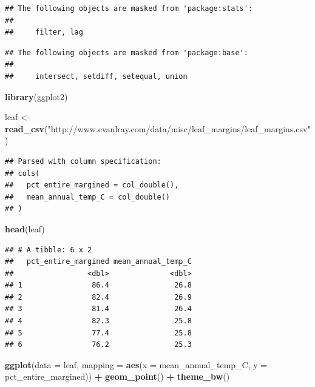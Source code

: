 \documentclass[]{article}
\newenvironment{Shaded}{\begin{snugshade}}{\end{snugshade}}
\newcommand{\KeywordTok}[1]{\textcolor[rgb]{0.13,0.29,0.53}{\textbf{#1}}}
\newcommand{\DataTypeTok}[1]{\textcolor[rgb]{0.13,0.29,0.53}{#1}}
\newcommand{\StringTok}[1]{\textcolor[rgb]{0.31,0.60,0.02}{#1}}
\newcommand{\OperatorTok}[1]{\textcolor[rgb]{0.81,0.36,0.00}{\textbf{#1}}}
\newcommand{\NormalTok}[1]{#1}
\begin{document}
\begin{verbatim}
## The following objects are masked from 'package:stats':
## 
##     filter, lag
\end{verbatim}

\begin{verbatim}
## The following objects are masked from 'package:base':
## 
##     intersect, setdiff, setequal, union
\end{verbatim}

\begin{Shaded}
\begin{Highlighting}[]
\KeywordTok{library}\NormalTok{(ggplot2)}

\NormalTok{leaf <-}\StringTok{ }\KeywordTok{read_csv}\NormalTok{(}\StringTok{"http://www.evanlray.com/data/misc/leaf_margins/leaf_margins.csv"}\NormalTok{)}
\end{Highlighting}
\end{Shaded}

\begin{verbatim}
## Parsed with column specification:
## cols(
##   pct_entire_margined = col_double(),
##   mean_annual_temp_C = col_double()
## )
\end{verbatim}

\begin{Shaded}
\begin{Highlighting}[]
\KeywordTok{head}\NormalTok{(leaf)}
\end{Highlighting}
\end{Shaded}

\begin{verbatim}
## # A tibble: 6 x 2
##   pct_entire_margined mean_annual_temp_C
##                 <dbl>              <dbl>
## 1                86.4               26.8
## 2                82.4               26.9
## 3                81.4               26.4
## 4                82.3               25.8
## 5                77.4               25.8
## 6                76.2               25.3
\end{verbatim}

\begin{Shaded}
\begin{Highlighting}[]
\KeywordTok{ggplot}\NormalTok{(}\DataTypeTok{data =}\NormalTok{ leaf, }\DataTypeTok{mapping =} \KeywordTok{aes}\NormalTok{(}\DataTypeTok{x =}\NormalTok{ mean_annual_temp_C, }\DataTypeTok{y =}\NormalTok{ pct_entire_margined)) }\OperatorTok{+}
\StringTok{  }\KeywordTok{geom_point}\NormalTok{() }\OperatorTok{+}
\StringTok{  }\KeywordTok{theme_bw}\NormalTok{()}
\end{Highlighting}
\end{Shaded}
\end{document}
